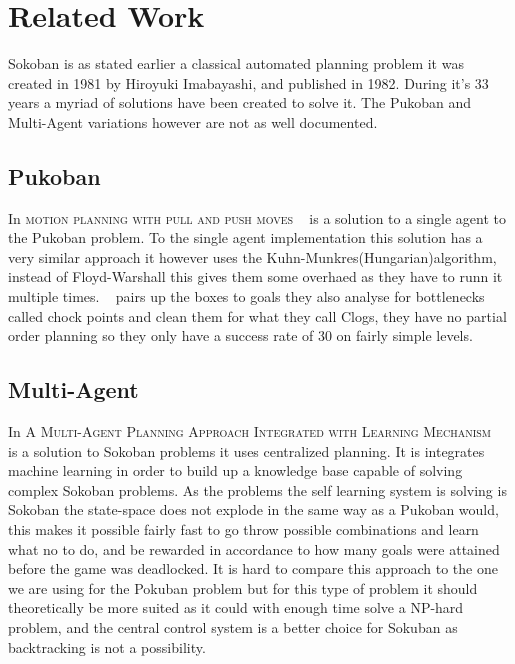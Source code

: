 \documentclass[letterpaper]{article}
\begin{document}
\section{Related Work}
	Sokoban is as stated earlier a classical automated planning problem it was created in 1981 by Hiroyuki Imabayashi, and published in 1982. During it's 33 years a myriad of solutions have been created to solve it.
	The Pukoban and Multi-Agent variations however are not as well documented.
	\subsection{Pukoban}
		In \textsc{motion planning with pull and push moves} ~\cite{Pukoban} is a solution to a single agent to the Pukoban problem. To the single agent implementation this solution has a very similar approach it however uses the Kuhn-Munkres(Hungarian)algorithm, instead of Floyd-Warshall this gives them some overhaed as they have to runn it multiple times.
		~\cite{Pukoban} pairs up the boxes to goals they also analyse for bottlenecks called chock points and clean them for what they call Clogs, they have no partial order planning   so they only have a success rate of 30 on fairly simple levels.
	\subsection{Multi-Agent}
		In \textsc{A Multi-Agent Planning Approach Integrated with Learning Mechanism} ~\cite{Multi-Agent} is a solution to Sokoban problems it uses centralized planning. It is integrates machine learning in order to build up a knowledge base capable of solving complex Sokoban problems. As the problems the self learning system is solving is Sokoban the state-space does not explode in the same way as a Pukoban would, this makes it possible fairly fast to go throw possible combinations and learn what no to do, and be rewarded in accordance to how many goals were attained before the game was deadlocked. It is hard to compare this approach to the one we are using for the Pokuban problem but for this type of problem it should theoretically be more suited as it could with enough time solve a NP-hard problem, and the central control system is a better choice for Sokuban as backtracking is not a possibility.
\end{document}
